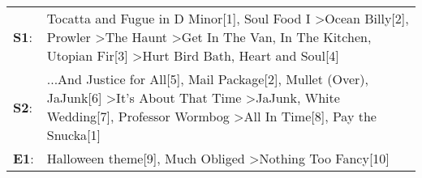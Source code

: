 \begin{supertabular}{p{0.03\textwidth}p{0.92\textwidth}}
 \textbf{S1}:  &  Tocatta and Fugue in D Minor[1]\textsuperscript{}, \enspace Soul Food I\textsuperscript{} \textgreater \enspace Ocean Billy[2]\textsuperscript{}, \enspace Prowler\textsuperscript{} \textgreater \enspace The Haunt\textsuperscript{} \textgreater \enspace Get In The Van\textsuperscript{}, \enspace In The Kitchen\textsuperscript{}, \enspace Utopian Fir[3]\textsuperscript{} \textgreater \enspace Hurt Bird Bath\textsuperscript{}, \enspace Heart and Soul[4]\textsuperscript{}  \enspace  \\
 \textbf{S2}:  &       ...And Justice for All[5]\textsuperscript{}, \enspace Mail Package[2]\textsuperscript{}, \enspace Mullet (Over)\textsuperscript{}, \enspace JaJunk[6]\textsuperscript{} \textgreater \enspace It's About That Time\textsuperscript{} \textgreater \enspace JaJunk\textsuperscript{}, \enspace White Wedding[7]\textsuperscript{}, \enspace Professor Wormbog\textsuperscript{} \textgreater \enspace All In Time[8]\textsuperscript{}, \enspace Pay the Snucka[1]\textsuperscript{}  \enspace  \\
 \textbf{E1}:  &                                                                                                                                                                                                                                                                                                                                               Halloween theme[9]\textsuperscript{}, \enspace Much Obliged\textsuperscript{} \textgreater \enspace Nothing Too Fancy[10]\textsuperscript{}  \enspace  \\
\end{supertabular}
